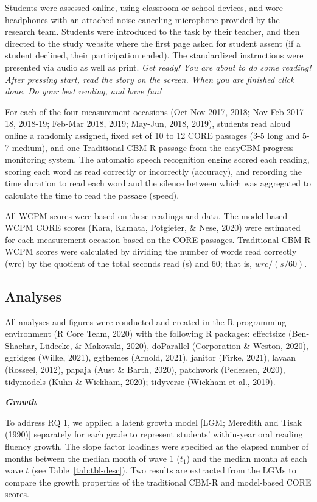 \documentclass[
  english,
  man, fleqn, noextraspace]{apa6}
\begin{document}
Students were assessed online, using classroom or school devices, and wore headphones with an attached noise-canceling microphone provided by the research team. Students were introduced to the task by their teacher, and then directed to the study website where the first page asked for student assent (if a student declined, their participation ended). The standardized instructions were presented via audio as well as print. \emph{Get ready! You are about to do some reading! After pressing start, read the story on the screen. When you are finished click done. Do your best reading, and have fun!}

For each of the four measurement occasions (Oct-Nov 2017, 2018; Nov-Feb 2017-18, 2018-19; Feb-Mar 2018, 2019; May-Jun, 2018, 2019), students read aloud online a randomly assigned, fixed set of 10 to 12 CORE passages (3-5 long and 5-7 medium), and one Traditional CBM-R passage from the easyCBM progress monitoring system. The automatic speech recognition engine scored each reading, scoring each word as read correctly or incorrectly (accuracy), and recording the time duration to read each word and the silence between which was aggregated to calculate the time to read the passage (speed).

All WCPM scores were based on these readings and data. The model-based WCPM CORE scores (Kara, Kamata, Potgieter, \& Nese, 2020) were estimated for each measurement occasion based on the CORE passages. Traditional CBM-R WCPM scores were calculated by dividing the number of words read correctly (wrc) by the quotient of the total seconds read (s) and 60; that is, \(wrc/(s/60)\).

\hypertarget{analyses}{%
\subsection{Analyses}\label{analyses}}

All analyses and figures were conducted and created in the R programming environment (R Core Team, 2020) with the following R packages: effectsize (Ben-Shachar, Lüdecke, \& Makowski, 2020), doParallel (Corporation \& Weston, 2020), ggridges (Wilke, 2021), ggthemes (Arnold, 2021), janitor (Firke, 2021), lavaan (Rosseel, 2012), papaja (Aust \& Barth, 2020), patchwork (Pedersen, 2020), tidymodels (Kuhn \& Wickham, 2020); tidyverse (Wickham et al., 2019).

\textbf{\emph{Growth}}

To address RQ 1, we applied a latent growth model {[}LGM; Meredith and Tisak (1990){]} separately for each grade to represent students' within-year oral reading fluency growth. The slope factor loadings were specified as the elapsed number of months between the median month of wave 1 (\(t_1\)) and the median month at each wave \(t\) (see Table~\ref{tab:tbl-desc}). Two results are extracted from the LGMs to compare the growth properties of the traditional CBM-R and model-based CORE scores.
\end{document}
